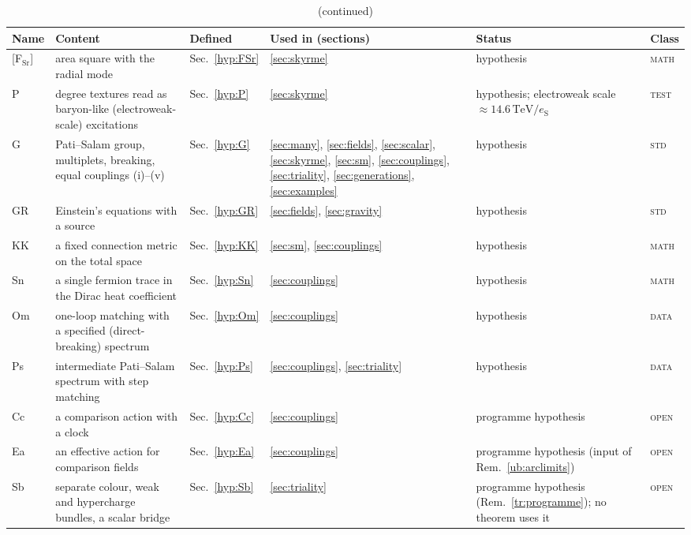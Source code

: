 \documentclass[aps,pra,onecolumn,superscriptaddress,nofootinbib,10pt]{revtex4-2}
\theoremstyle{definition}
\theoremstyle{remark}
\begin{document}
\begin{table}[p]
\caption{(continued)}
\footnotesize
\begin{tabular}{@{}p{}p{}p{}p{}p{}p{}@{}}
\toprule
Name & Content & Defined & Used in (sections) & Status & Class\\
\midrule
{[F$_{\mathrm{Sr}}$]} & area square with the radial mode & Sec.~\ref{hyp:FSr} & \ref{sec:skyrme} & hypothesis & \textsc{math}\\
{P} & degree textures read as baryon-like (electroweak-scale) excitations & Sec.~\ref{hyp:P} & \ref{sec:skyrme} & hypothesis; electroweak scale $\approx14.6\,\mathrm{TeV}/e_{\mathrm S}$ & \textsc{test}\\
{G} & Pati--Salam group, multiplets, breaking, equal couplings (i)--(v) & Sec.~\ref{hyp:G} & \ref{sec:many}, \ref{sec:fields}, \ref{sec:scalar}, \ref{sec:skyrme}, \ref{sec:sm}, \ref{sec:couplings}, \ref{sec:triality}, \ref{sec:generations}, \ref{sec:examples} & hypothesis & \textsc{std}\\
{GR} & Einstein's equations with a source & Sec.~\ref{hyp:GR} & \ref{sec:fields}, \ref{sec:gravity} & hypothesis & \textsc{std}\\
{KK} & a fixed connection metric on the total space & Sec.~\ref{hyp:KK} & \ref{sec:sm}, \ref{sec:couplings} & hypothesis & \textsc{math}\\
{Sn} & a single fermion trace in the Dirac heat coefficient & Sec.~\ref{hyp:Sn} & \ref{sec:couplings} & hypothesis & \textsc{math}\\
{Om} & one-loop matching with a specified (direct-breaking) spectrum & Sec.~\ref{hyp:Om} & \ref{sec:couplings} & hypothesis & \textsc{data}\\
{Ps} & intermediate Pati--Salam spectrum with step matching & Sec.~\ref{hyp:Ps} & \ref{sec:couplings}, \ref{sec:triality} & hypothesis & \textsc{data}\\
{Cc} & a comparison action with a clock & Sec.~\ref{hyp:Cc} & \ref{sec:couplings} & programme hypothesis & \textsc{open}\\
{Ea} & an effective action for comparison fields & Sec.~\ref{hyp:Ea} & \ref{sec:couplings} & programme hypothesis (input of Rem.~\ref{ub:arclimits}) & \textsc{open}\\
{Sb} & separate colour, weak and hypercharge bundles, a scalar bridge & Sec.~\ref{hyp:Sb} & \ref{sec:triality} & programme hypothesis (Rem.~\ref{tr:programme}); no theorem uses it & \textsc{open}\\

\end{tabular}
\end{table}
\end{document}
